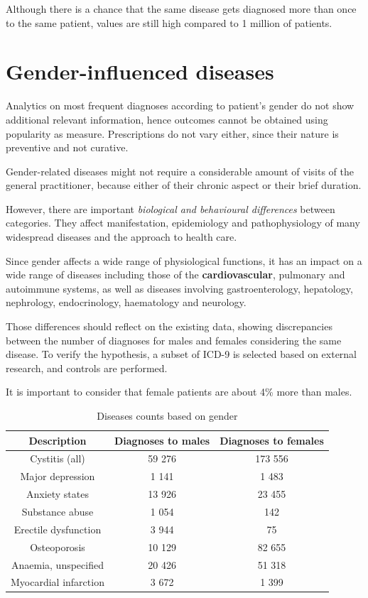 Although there is a chance that the same disease gets diagnosed more than once to the same patient, values are still high compared to 1 million of patients.

\section{Gender-influenced diseases}
Analytics on most frequent diagnoses according to patient's gender do not show additional relevant information, hence outcomes cannot be obtained using popularity as measure. Prescriptions do not vary either, since their nature is preventive and not curative.

Gender-related diseases might not require a considerable amount of visits of the general practitioner, because either of their chronic aspect or their brief duration.

However, there are important \textit{biological and behavioural differences} between categories. They affect manifestation, epidemiology and pathophysiology of many widespread diseases and the approach to health care. 

Since gender affects a wide range of physiological functions, it has an impact on a wide range of diseases including those of the \textbf{cardiovascular}, pulmonary and autoimmune systems, as well as diseases involving gastroenterology, hepatology, nephrology, endocrinology, haematology and neurology\cite{gender}.

Those differences should reflect on the existing data, showing discrepancies between the number of diagnoses for males and females considering the same disease. To verify the hypothesis, a subset of ICD-9 is selected based on external research, and controls are performed.

It is important to consider that female patients are about 4\% more than males.

\begin{table}[h]
	\centering
	\begin{tabular}{c|c|c}
		\textbf{Description} & \textbf{Diagnoses to males} & \textbf{Diagnoses to females} \\
		\hline
		Cystitis (all) & 59 276 & 173 556 \\
		\hline
		Major depression & 1 141 & 1 483 \\
		\hline
		Anxiety states & 13 926 & 23 455 \\
		\hline
		Substance abuse & 1 054 & 142 \\
		\hline
		Erectile dysfunction & 3 944 & 75 \\
		\hline 
		Osteoporosis & 10 129 & 82 655 \\
		\hline
		Anaemia, unspecified & 20 426 & 51 318 \\
		\hline
		Myocardial infarction & 3 672 & 1 399 \\
	\end{tabular}
	\caption{\small Diseases counts based on gender}
\end{table}

